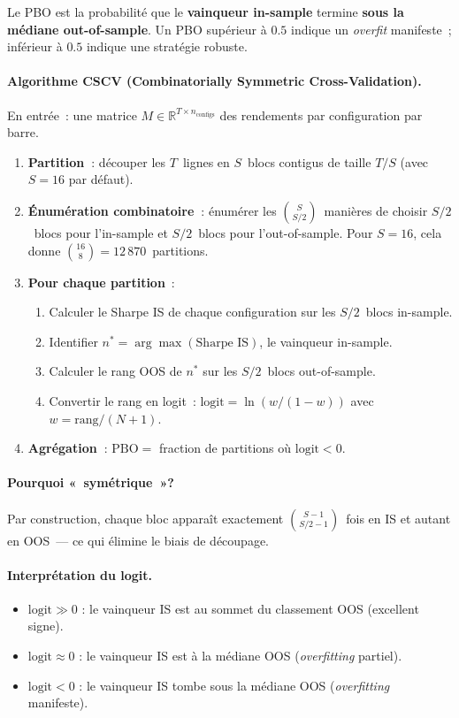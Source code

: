 Le PBO est la probabilité que le \textbf{vainqueur in-sample} termine \textbf{sous la médiane out-of-sample}. Un PBO supérieur à $0.5$ indique un \emph{overfit} manifeste~; inférieur à $0.5$ indique une stratégie robuste.

\paragraph{Algorithme CSCV (Combinatorially Symmetric Cross-Validation).}
En entrée~: une matrice $M \in \mathbb{R}^{T \times n_{\text{configs}}}$ des rendements par configuration par barre.
\begin{enumerate}
\item \textbf{Partition~}: découper les $T$~lignes en $S$~blocs contigus de taille $T/S$ (avec $S = 16$ par défaut).
\item \textbf{Énumération combinatoire~}: énumérer les $\binom{S}{S/2}$~manières de choisir $S/2$~blocs pour l'in-sample et $S/2$~blocs pour l'out-of-sample. Pour $S = 16$, cela donne $\binom{16}{8} = 12\,870$~partitions.
\item \textbf{Pour chaque partition}~:
    \begin{enumerate}
    \item Calculer le Sharpe IS de chaque configuration sur les $S/2$~blocs in-sample.
    \item Identifier $n^{*} = \arg\max(\text{Sharpe IS})$, le vainqueur in-sample.
    \item Calculer le rang OOS de $n^{*}$ sur les $S/2$~blocs out-of-sample.
    \item Convertir le rang en logit~: $\text{logit} = \ln(w/(1-w))$ avec $w = \text{rang}/(N+1)$.
    \end{enumerate}
\item \textbf{Agrégation~}: $\mathrm{PBO} = $ fraction de partitions où $\text{logit} < 0$.
\end{enumerate}

\paragraph{Pourquoi «~symétrique~»?} Par construction, chaque bloc apparaît exactement $\binom{S - 1}{S/2 - 1}$~fois en IS et autant en OOS~--- ce qui élimine le biais de découpage.

\paragraph{Interprétation du logit.}
\begin{itemize}
\item $\text{logit} \gg 0$ : le vainqueur IS est au sommet du classement OOS (excellent signe).
\item $\text{logit} \approx 0$ : le vainqueur IS est à la médiane OOS (\emph{overfitting} partiel).
\item $\text{logit} < 0$ : le vainqueur IS tombe sous la médiane OOS (\emph{overfitting} manifeste).
\end{itemize}

